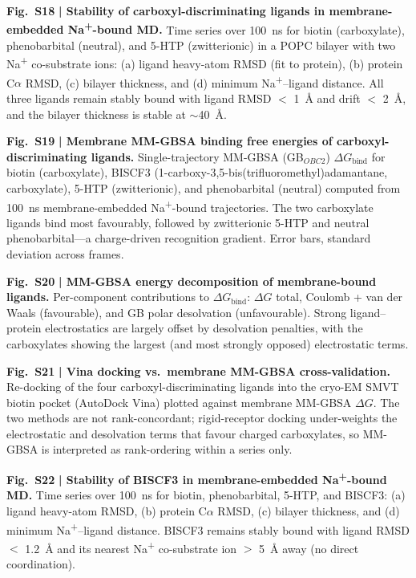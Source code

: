 \documentclass[10pt,letterpaper]{article}
\begin{document}
\noindent\textbf{Fig.~S18} \textbf{| Stability of carboxyl-discriminating ligands in membrane-embedded Na\textsuperscript{+}-bound MD.} Time series over 100~ns for biotin (carboxylate), phenobarbital (neutral), and 5-HTP (zwitterionic) in a POPC bilayer with two Na\textsuperscript{+} co-substrate ions: (a) ligand heavy-atom RMSD (fit to protein), (b) protein C$\alpha$ RMSD, (c) bilayer thickness, and (d) minimum Na\textsuperscript{+}--ligand distance. All three ligands remain stably bound with ligand RMSD $<$ 1~\AA{} and drift $<$ 2~\AA{}, and the bilayer thickness is stable at $\sim$40~\AA{}.

\noindent\textbf{Fig.~S19} \textbf{| Membrane MM-GBSA binding free energies of carboxyl-discriminating ligands.} Single-trajectory MM-GBSA (GB$_{OBC2}$) $\Delta G_{\mathrm{bind}}$ for biotin (carboxylate), BISCF3 (1-carboxy-3,5-bis(trifluoromethyl)adamantane, carboxylate), 5-HTP (zwitterionic), and phenobarbital (neutral) computed from 100~ns membrane-embedded Na\textsuperscript{+}-bound trajectories. The two carboxylate ligands bind most favourably, followed by zwitterionic 5-HTP and neutral phenobarbital---a charge-driven recognition gradient. Error bars, standard deviation across frames.

\noindent\textbf{Fig.~S20} \textbf{| MM-GBSA energy decomposition of membrane-bound ligands.} Per-component contributions to $\Delta G_{\mathrm{bind}}$: $\Delta G$ total, Coulomb + van der Waals (favourable), and GB polar desolvation (unfavourable). Strong ligand--protein electrostatics are largely offset by desolvation penalties, with the carboxylates showing the largest (and most strongly opposed) electrostatic terms.

\noindent\textbf{Fig.~S21} \textbf{| Vina docking vs.\ membrane MM-GBSA cross-validation.} Re-docking of the four carboxyl-discriminating ligands into the cryo-EM SMVT biotin pocket (AutoDock Vina) plotted against membrane MM-GBSA $\Delta G$. The two methods are not rank-concordant; rigid-receptor docking under-weights the electrostatic and desolvation terms that favour charged carboxylates, so MM-GBSA is interpreted as rank-ordering within a series only.

\noindent\textbf{Fig.~S22} \textbf{| Stability of BISCF3 in membrane-embedded Na\textsuperscript{+}-bound MD.} Time series over 100~ns for biotin, phenobarbital, 5-HTP, and BISCF3: (a) ligand heavy-atom RMSD, (b) protein C$\alpha$ RMSD, (c) bilayer thickness, and (d) minimum Na\textsuperscript{+}--ligand distance. BISCF3 remains stably bound with ligand RMSD $<$ 1.2~\AA{} and its nearest Na\textsuperscript{+} co-substrate ion $>$ 5~\AA{} away (no direct coordination).
\end{document}
